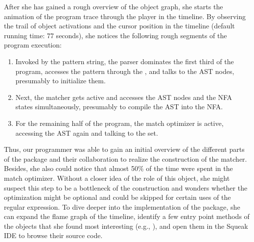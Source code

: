 After she has gained a rough overview of the object graph, she starts the animation of the program trace through the player in the timeline.
By observing the trail of object activations and the cursor position in the timeline (default running time: 77 seconds), she notices the following rough segments of the program execution:

\begin{enumerate}
	\item Invoked by the pattern string, the parser dominates the first third of the program, accesses the pattern through the , and talks to the AST nodes, presumably to initialize them.
	\item Next, the matcher gets active and accesses the AST nodes and the NFA states simultaneously, presumably to compile the AST into the NFA.
	\item For the remaining half of the program, the match optimizer is active, accessing the AST again and talking to the set.
\end{enumerate}

Thus, our programmer was able to gain an initial overview of the different parts of the  package and their collaboration to realize the construction of the matcher.
Besides, she also could notice that almost 50\si{\percent} of the time were spent in the match optimizer.
Without a closer idea of the role of this object, she might suspect this step to be a bottleneck of the construction and wonders whether the optimization might be optional and could be skipped for certain uses of the regular expression.
To dive deeper into the implementation of the  package, she can expand the flame graph of the timeline, identify a few entry point methods of the objects that she found most interesting (e.g., ), and open them in the Squeak IDE to browse their source code.

